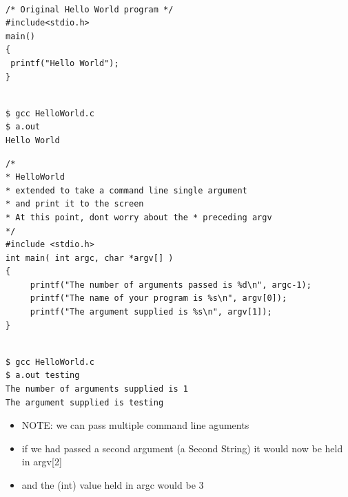 \documentclass{beamer}
\begin{document}
\begin{frame}[fragile]
\begin{block}{}
\begin{lstlisting}

/* Original Hello World program */
#include<stdio.h>
main()
{
 printf("Hello World");
}

\end{lstlisting}
\end{block}

\begin{block}{}
\begin{lstlisting}

$ gcc HelloWorld.c
$ a.out
Hello World

\end{lstlisting}
\end{block}

\end{frame}


\begin{frame}[fragile]
\begin{block}{}
\begin{lstlisting}
/* 
* HelloWorld 
* extended to take a command line single argument 
* and print it to the screen
* At this point, dont worry about the * preceding argv
*/
#include <stdio.h>
int main( int argc, char *argv[] )  
{
     printf("The number of arguments passed is %d\n", argc-1);
     printf("The name of your program is %s\n", argv[0]);
     printf("The argument supplied is %s\n", argv[1]);
}
\end{lstlisting}
\end{block}
\end{frame}

\begin{frame}[fragile]
\begin{block}{}
\begin{lstlisting}

$ gcc HelloWorld.c
$ a.out testing
The number of arguments supplied is 1
The argument supplied is testing

\end{lstlisting}
\end{block}
\end{frame}


\begin{frame}
\begin{itemize}
\item NOTE: we can pass multiple command line aguments
\item if we had passed a second argument (a Second String) it would now be held in argv[2]
\item and the (int) value held in argc would be 3
\end{itemize}
\end{frame}
\end{document}
